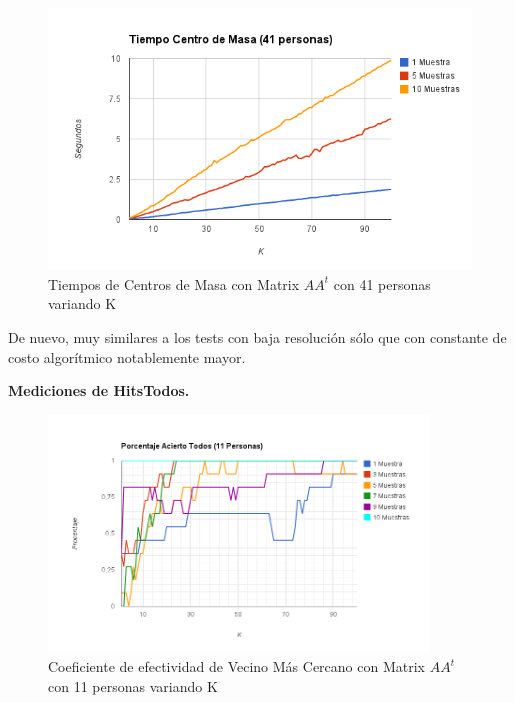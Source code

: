 \begin{figure}[H] \includegraphics[width=1\textwidth]{img/imagef9.png} \caption{Tiempos de Centros
    de Masa con Matrix $AA^t$ con 41 personas variando K} \end{figure}

De nuevo, muy similares a los tests con baja resolución sólo que con constante de costo algor\'itmico notablemente mayor.

\textbf{Mediciones de HitsTodos. }

\begin{figure}[H] \includegraphics[width=0.9\textwidth]{img/imagef10.png} \caption{Coeficiente de
    efectividad de Vecino Más Cercano con Matrix $AA^t$ con 11 personas variando K} \end{figure}

